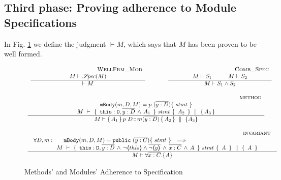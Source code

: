 \subsection{Third phase: Proving adherence to Module Specifications}
\label{sect:wf}

In Fig. \ref{f:wf} we  define the judgment $\vdash M$, which says that %
$M$ has been proven to be well formed. 



\begin{figure}[thb]
$
\begin{array}{l}
\begin{array}{lcl}
\inferruleSDNarrow 
{~ \strut  {\sc{WellFrm\_Mod}}}
{  M \vdash \SpecOf {M}
}
{
\vdash M  
}
& \hspace{0.7cm} &
\inferruleSDNarrow 
{~ \strut   {\sc{Comb\_Spec}}}
{  
M \vdash S_1 \hspace{1cm}  M \vdash S_2
}
{
M \vdash S_1 \wedge S_2
}
\end{array}
\\
\\
\inferruleSD 
{~ \strut \hspace{6.5cm} {\sc{method}}}
{  
 \prg{mBody}(m,D,M)=p \ (\overline{y:D})\{\  stmt \ \}  %
    \\
  {\hprovesN{M} { \ \prg{this}:\prg{D}, \overline{y:D}\, \wedge\, A_1\  } {\ stmt\ } {\ A_2 \ }   {A_3} } 
}
{
M \vdash {\mprepostN {A_1}{p\ D}{m}{y}{D}{A_2} {A_3} }
}
\\
\\
\inferruleSD 
{~ \strut \hspace{6.5cm} {\sc{invariant}}}
{  
\begin{array}{l}
\forall  D,  m:\ \ \  \ \  \prg{mBody}(m,D,M)=\prg{public} \ (\overline{y:C})\{\  stmt \ \}      \ \ \Longrightarrow  
    \\
   ~ \strut \hspace{0.7cm}  \ \ \ \  \  %
 {\hprovesN{M} { \ \prg{this}:\prg{D}, \overline{y:D}\, \wedge\, \neg\inside{this}\wedge\overline{ \neg\inside{y}}\, \wedge\, \overline{x:C}\, \wedge\,  A\  } {\ stmt\ } {\ A\ } {\ A \ }  }\ \ \ \ \  \ \  
\end{array}
}
{
M \vdash \TwoStatesN{ \overline{x:C}} {A}
}
\end{array}
$
\caption{Methods' and Modules' Adherence to Specification}
\label{f:wf}
\end{figure}

